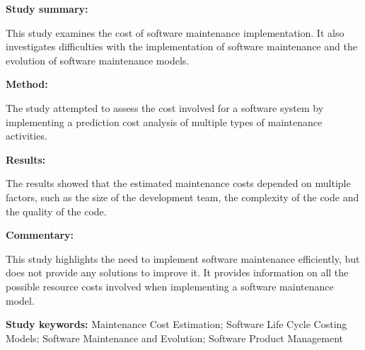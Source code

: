\begin{tcolorbox}[colback=gray!5!white, colframe=pastelgreen!40!black, title=A cost model for software maintenance \& evolution\cite{Sneed2004}]
	\begin{minipage}[t]{0.25\textwidth}
		\textbf{Study summary:}
	\end{minipage}
	\hfill
	\begin{minipage}[t]{0.65\textwidth}
		This study examines the cost of software maintenance implementation. It also investigates difficulties with the implementation of software maintenance and the evolution of software maintenance models. 
	\end{minipage}

	\vspace{0.75em} 

	\begin{minipage}[t]{0.25\textwidth}
		\textbf{Method:}
	\end{minipage}
	\hfill
	\begin{minipage}[t]{0.65\textwidth}
		The study attempted to assess the cost involved for a software system by implementing a prediction cost analysis of multiple types of maintenance activities.
	\end{minipage}

	\vspace{0.75em} 

	\begin{minipage}[t]{0.25\textwidth}
		\textbf{Results:}
	\end{minipage}
	\hfill
	\begin{minipage}[t]{0.65\textwidth}
		The results showed that the estimated maintenance costs depended on multiple factors, such as the size of the development team, the complexity of the code and the quality of the code.
	\end{minipage}

	\vspace{0.75em} 

	\begin{minipage}[t]{0.25\textwidth}
		\textbf{Commentary:}
	\end{minipage}
	\hfill
	\begin{minipage}[t]{0.65\textwidth}
		This study highlights the need to implement software maintenance efficiently, but does not provide any solutions to improve it. It provides information on all the possible resource costs involved when implementing a software maintenance model.
	\end{minipage}
	\tcblower
	\textbf{Study keywords:} Maintenance Cost Estimation; Software Life Cycle Costing Models;
Software Maintenance and Evolution; Software Product Management
\end{tcolorbox}


